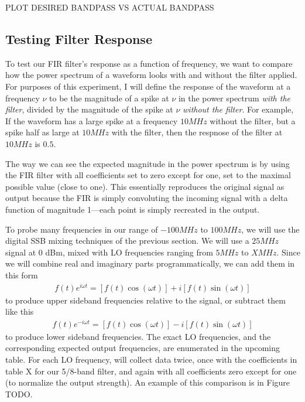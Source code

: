 \documentclass[12pt]{article}
\begin{document}
PLOT DESIRED BANDPASS VS ACTUAL BANDPASS

\subsection*{Testing Filter Response}
To test our FIR filter's response as a function of frequency, we want to compare how the power spectrum of a waveform looks with and without the filter applied. For purposes of this experiment, I will define the response of the waveform at a frequency $\nu$ to be the magnitude of a spike at $\nu$ in the power spectrum \textit{with the filter}, divided by the magnitude of the spike at $\nu$ \textit{without the filter}. For example, If the waveform has a large spike at a frequency $10 MHz$ without the filter, but a spike half as large at $10 MHz$ with the filter, then the respnose of the filter at $10 MHz$ is $0.5$. 

The way we can see the expected magnitude in the power spectrum is by using the FIR filter with all coefficients set to zero except for one, set to the maximal possible value (close to one). This essentially reproduces the original signal as output because the FIR is simply convoluting the incoming signal with a delta function of magnitude 1---each point is simply recreated in the output.

To probe many frequencies in our range of $-100 MHz$ to $100 MHz$, we will use the digital SSB mixing techniques of the previous section. We will use a $25 MHz$ signal at $0$ dBm, mixed with LO frequencies ranging from $5 MHz$ to $X MHz$. Since we will combine real and imaginary parts programmatically, we can add them in this form
\begin{eqnarray}
f(t) e^{i\omega t} = [f(t) \cos(\omega t)] + i [f(t) \sin(\omega t)] \label{eq:mixingexp}
\end{eqnarray}
to produce upper sideband frequencies relative to the signal, or subtract them like this
\begin{eqnarray}
f(t) e^{-i\omega t} = [f(t) \cos(\omega t)] - i [f(t) \sin(\omega t)] \label{eq:mixingexp}
\end{eqnarray}
to produce lower sideband frequencies. The exact LO frequencies, and the corresponding expected output frequencies, are enumerated in the upcoming table. For each LO frequency, will collect data twice, once with the coefficients in table X for our 5/8-band filter, and again with all coefficients zero except for one (to normalize the output strength). An example of this comparison is in Figure TODO.
\end{document}
